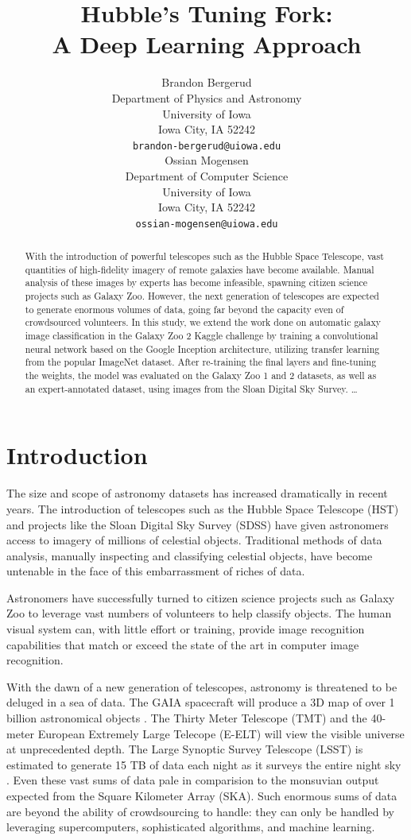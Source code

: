 \documentclass{article}
\title{Hubble's Tuning Fork: \\A Deep Learning Approach}
\author{
  Brandon Bergerud \\
  Department of Physics and Astronomy\\
  University of Iowa\\
  Iowa City, IA  52242 \\
  \texttt{brandon-bergerud@uiowa.edu} \\
  \And
  Ossian Mogensen \\
  Department of Computer Science \\
  University of Iowa \\
  Iowa City, IA  52242 \\
  \texttt{ossian-mogensen@uiowa.edu} \\
}
\begin{document}

\maketitle

\begin{abstract}
With the introduction of powerful telescopes such as the Hubble Space Telescope, vast quantities of high-fidelity imagery of remote galaxies have become available. Manual analysis of these images by experts has become infeasible, spawning citizen science projects such as Galaxy Zoo. However, the next generation of telescopes are expected to generate enormous volumes of data, going far beyond the capacity even of crowdsourced volunteers. In this study, we extend the work done on automatic galaxy image classification in the Galaxy Zoo 2 Kaggle challenge by training a convolutional neural network based on the Google Inception architecture, utilizing transfer learning from the popular ImageNet dataset. After re-training the final layers and fine-tuning the weights, the model was evaluated on the Galaxy Zoo 1 and 2 datasets, as well as an expert-annotated dataset, using images from the Sloan Digital Sky Survey. \ldots
\end{abstract}

\section{Introduction}
The size and scope of astronomy datasets has increased dramatically in recent years. The introduction of telescopes such as the Hubble Space Telescope (HST) and projects like the Sloan Digital Sky Survey (SDSS) have given astronomers access to imagery of millions of celestial objects. Traditional methods of data analysis, manually inspecting and classifying celestial objects, have become untenable in the face of this embarrassment of riches of data. 

Astronomers have successfully turned to citizen science projects such as Galaxy Zoo to leverage vast numbers of volunteers to help classify objects. The human visual system can, with little effort or training, provide image recognition capabilities that match or exceed the state of the art in computer image recognition. 

With the dawn of a new generation of telescopes, astronomy is threatened to be deluged in a sea of data. The GAIA spacecraft will produce a 3D map of over 1 billion astronomical objects \citep{2016A&A...595A...1G}. The Thirty Meter Telescope (TMT) \citep{2015RAA....15.1945S} and the 40-meter European Extremely Large Telecope (E-ELT) will view the visible universe at unprecedented depth. The Large Synoptic Survey Telescope (LSST) is estimated to generate 15 TB of data each night as it surveys the entire night sky \citep{2009AAS...21346003I}. Even these vast sums of data pale in comparision to the monsuvian output expected from the Square Kilometer Array (SKA). Such enormous sums of data are beyond the ability of crowdsourcing to handle: they can only be handled by leveraging supercomputers, sophisticated algorithms, and machine learning.
\end{document}
